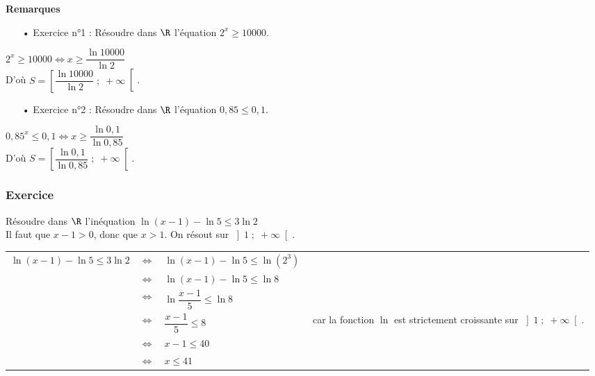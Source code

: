 \vspace*{.3cm}

\textbf{Remarques} \\

\begin{itemize}
\item[•] Exercice n°1 : Résoudre dans $\R$ l'équation $2^x \geqslant 10 000$. \\
\end{itemize}

$2^x \geqslant 10 000 \Longleftrightarrow x \geqslant \dfrac{\ln 10 000}{\ln 2}$ \\

D'où $S = \left[\dfrac{\ln 10 000}{\ln 2} \; ; \; +\infty\right[$.  \\


\begin{itemize}
\item[•] Exercice n°2 : Résoudre dans $\R$ l'équation $0,85 \leqslant 0,1$. \\
\end{itemize}

$0,85^x \leqslant 0,1 \Longleftrightarrow x \geqslant \dfrac{\ln 0,1}{\ln 0,85}$ \\

D'où $S = \left[\dfrac{\ln 0,1}{\ln 0,85} \; ; \; +\infty\right[$.  \\

\vspace*{-.3cm}

\subsubsection{Exercice }

Résoudre dans $\R$ l'inéquation $\ln \left(x-1\right) - \ln 5 \leqslant 3 \ln 2$ \\

Il faut que $x-1 > 0$, donc que $x > 1$. On résout sur $\left]1 \; ; \; +\infty\right[$. \\

\begin{tabular}{llll}
$\ln \left(x-1\right) - \ln 5 \leqslant 3 \ln 2$ & $\Longleftrightarrow$ & $\ln \left(x-1\right) - \ln 5 \leqslant \ln \left(2^3\right)$ & \\
& $\Longleftrightarrow$ & $\ln \left(x-1\right) - \ln 5 \leqslant \ln 8$ & \\
& $\Longleftrightarrow$ & $\ln \dfrac{x-1}{5} \leqslant \ln 8$ & \vspace*{.1cm}
\\
& $\Longleftrightarrow$ & $\dfrac{x-1}{5} \leqslant 8$ & $ \! \! \! \! \! \! \! \! \! \! \! \! \! \! \! \! \! \! \! \! \! \! \! \! \! \! \! \! \! \! $ car la fonction $\ln$ est strictement croissante sur $\left]1 \; ; \; +\infty\right[$. \\
& $\Longleftrightarrow$ & $x-1 \leqslant 40$ & \\
& $\Longleftrightarrow$ & $x \leqslant 41$ & \\
\end{tabular}

